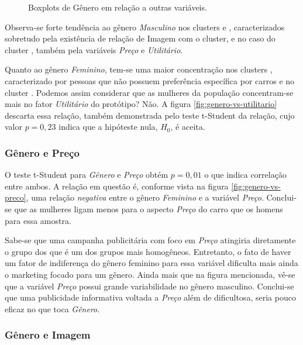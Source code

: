 \begin{figure}[h]
\begin{centering}
{}
\par\end{centering}

\caption{Boxplots de Gênero em relação a outras variáveis.}
\end{figure}

Observa-se forte tendência ao gênero \emph{Masculino} nos clusters
\emph{\nomeCa{}} e \emph{\nomeCb{}}, caracterizados sobretudo pela existência
de relação de Imagem com o cluster, e no caso do cluster \emph{\nomeCa{}},
também pela variáveis \emph{Preço} e \emph{Utilitário}.

Quanto ao gênero \emph{Feminino}, tem-se uma maior concentração nos
clusters \emph{\nomeCc{}}, caracterizado por pessoas que não possuem preferência
específica por carros e no cluster \emph{\nomeCd{}}. Podemos assim considerar
que as mulheres da população concentram-se mais no fator \emph{Utilitário}
do protótipo? Não. A figura \ref{fig:genero-vs-utilitario} descarta
essa relação, também demonstrada pelo teste t-Student da relação,
cujo valor $p=0,23$ indica que a hipóteste nula, $H_{0}$, é aceita.


\subsubsection{Gênero e Preço}

O teste t-Student para \emph{Gênero} e \emph{Preço} obtém $p=0,01$ o que indica
correlação entre ambos. A relação em questão é, conforme vista na
figura \ref{fig:genero-vs-preco}, uma relação \emph{negativa} entre
o gênero \emph{Feminino} e a variável \emph{Preço}. Conclui-se que
as mulheres ligam menos para o aspecto \emph{Preço} do carro que os
homens para essa amostra. 

Sabe-se que uma campanha publicitária com foco em \emph{Preço} atingiria
diretamente o grupo dos \emph{\nomeCc{}} que é um dos grupos mais
homogêneos. Entretanto, o fato de haver um fator de indiferença do
gênero feminino para essa variável dificulta mais ainda o marketing
focado para um gênero. Ainda mais que na figura mencionada, vê-se
que a variável \emph{Preço} possui grande variabilidade no gênero masculino.
Conclui-se que uma publicidade informativa voltada a \emph{Preço} além
de dificultosa, seria pouco eficaz no que toca \emph{Gênero}.


\subsubsection{Gênero e Imagem}

